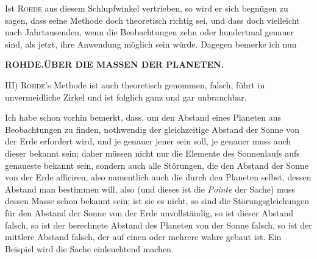 Ist \textsc{Rohde} aus diesem Schlupfwinkel vertrieben, so wird er sich begnügen zu sagen, dass seine Methode doch theoretisch richtig sei, und dass doch vielleicht nach Jahrtausenden, wenn die Beobachtungen zehn oder hundertmal genauer sind, als jetzt, ihre Anwendung möglich sein würde. Dagegen bemerke ich nun

\clearpage
\thispagestyle{empty}
\noindent{}%
\makebox[12mm][l]{}%
\parbox[t]{\dimexpr\linewidth-24mm\relax}{\centering\footnotesize\bfseries ROHDE.\enspace ÜBER DIE MASSEN DER PLANETEN.\par}%
\par\nobreak\medskip
III) \textsc{Rohde}'s Methode ist auch theoretisch genommen, falsch, führt in unvermeidliche Zirkel und ist folglich ganz und gar unbrauchbar.

Ich habe schon vorhin bemerkt, dass, um den Abstand eines Planeten aus Beobachtungen zu finden, nothwendig der gleichzeitige Abstand der Sonne von der Erde erfordert wird, und je genauer jener sein soll, je genauer muss auch dieser bekannt sein; daher müssen nicht nur die Elemente des Sonnenlaufs aufs genaueste bekannt sein, sondern auch alle Störungen, die den Abstand der Sonne von der Erde afficiren, also namentlich auch die durch den Planeten selbst, dessen Abstand man bestimmen will, also (und dieses ist die \emph{Pointe} der Sache) muss dessen Masse schon bekannt sein; ist sie es nicht, so sind die Störungsgleichungen für den Abstand der Sonne von der Erde unvollständig, so ist dieser Abstand falsch, so ist der berechnete Abstand des Planeten von der Sonne falsch, so ist der mittlere Abstand falsch, der auf einen oder mehrere wahre gebaut ist. Ein Beispiel wird die Sache einleuchtend machen.

